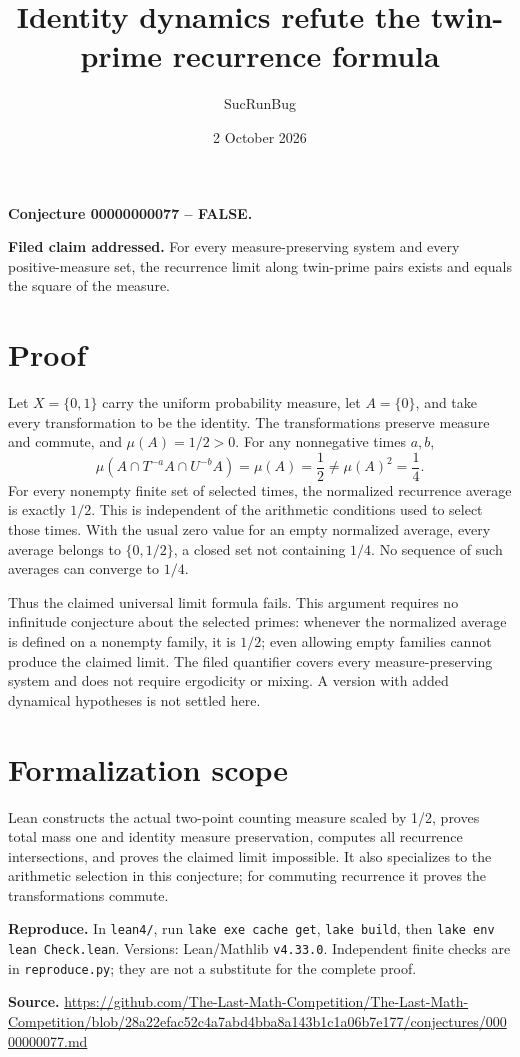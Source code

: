 \documentclass[11pt]{article}
\title{Identity dynamics refute the twin-prime recurrence formula}
\author{SucRunBug}
\date{2 October 2026}
\begin{document}
\maketitle
\textbf{Conjecture 00000000077 -- FALSE.}

\textbf{Filed claim addressed.} For every measure-preserving system and every positive-measure set, the recurrence limit along twin-prime pairs exists and equals the square of the measure.

\section*{Proof}
Let $X=\{0,1\}$ carry the uniform probability measure, let $A=\{0\}$, and take every transformation to be the identity. The transformations preserve measure and commute, and $\mu(A)=1/2>0$. For any nonnegative times $a,b$,
\[\mu(A\cap T^{-a}A\cap U^{-b}A)=\mu(A)=\frac12\ne\mu(A)^2=\frac14.\]
For every nonempty finite set of selected times, the normalized recurrence average is exactly $1/2$. This is independent of the arithmetic conditions used to select those times. With the usual zero value for an empty normalized average, every average belongs to $\{0,1/2\}$, a closed set not containing $1/4$. No sequence of such averages can converge to $1/4$.

Thus the claimed universal limit formula fails. This argument requires no infinitude conjecture about the selected primes: whenever the normalized average is defined on a nonempty family, it is $1/2$; even allowing empty families cannot produce the claimed limit. The filed quantifier covers every measure-preserving system and does not require ergodicity or mixing. A version with added dynamical hypotheses is not settled here.

\section*{Formalization scope}
Lean constructs the actual two-point counting measure scaled by 1/2, proves total mass one and identity measure preservation, computes all recurrence intersections, and proves the claimed limit impossible. It also specializes to the arithmetic selection in this conjecture; for commuting recurrence it proves the transformations commute.

\textbf{Reproduce.} In \texttt{lean4/}, run \texttt{lake exe cache get},
\texttt{lake build}, then \texttt{lake env lean Check.lean}. Versions:
Lean/Mathlib \texttt{v4.33.0}. Independent finite checks are in
\texttt{reproduce.py}; they are not a substitute for the complete proof.

\textbf{Source.} \url{https://github.com/The-Last-Math-Competition/The-Last-Math-Competition/blob/28a22efac52c4a7abd4bba8a143b1c1a06b7e177/conjectures/00000000077.md}
\end{document}
